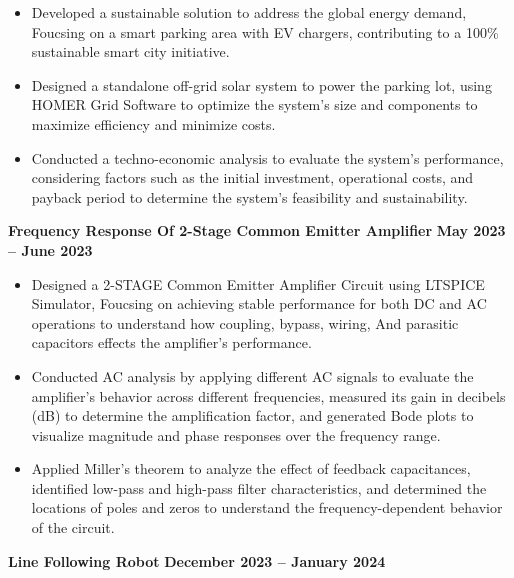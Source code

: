 \documentclass[10pt,a4paper]{article}
\begin{document}
\begin{itemize}[leftmargin=*]
    \vspace{-8mm}
    \item Developed a sustainable solution to address the global energy demand, Foucsing on a smart parking area with EV
    chargers, contributing to a 100\%  sustainable smart city initiative.
    \vspace{-2mm}
    \item Designed a standalone off-grid solar system to power the parking lot, using HOMER Grid Software to optimize the system's size and components to maximize efficiency and minimize costs.
    \vspace{-2mm}
    \item Conducted a techno-economic analysis to evaluate the system's performance, considering factors such as the initial investment, operational costs, and payback period to determine the system's feasibility and sustainability.
\end{itemize}
\vspace{-2mm}
\textbf{Frequency Response Of 2-Stage Common Emitter Amplifier} \hfill \textbf{May 2023 -- June 2023} \\
\begin{itemize}[leftmargin=*]
    \vspace{-8mm}
    \item Designed a 2-STAGE Common Emitter Amplifier Circuit using LTSPICE Simulator, Foucsing on achieving stable performance for both DC and AC operations to understand how coupling, bypass, wiring, And parasitic capacitors effects  the amplifier's performance.
    \vspace{-2mm}
    \item Conducted AC analysis by applying different AC signals to evaluate the amplifier's behavior across different frequencies, measured its gain in decibels (dB) to determine the amplification factor, and generated Bode plots to visualize magnitude and phase responses over the frequency range.
   \vspace{-2mm}
    \item Applied Miller's theorem to analyze the effect of feedback capacitances, identified low-pass and high-pass filter characteristics, and determined the locations of poles and zeros to understand the frequency-dependent behavior of the circuit.
    \vspace{-2mm}
\end{itemize}
\vspace{-2mm}
\textbf{Line Following Robot} \hfill \textbf{December 2023 -- January 2024} \\
\end{document}
